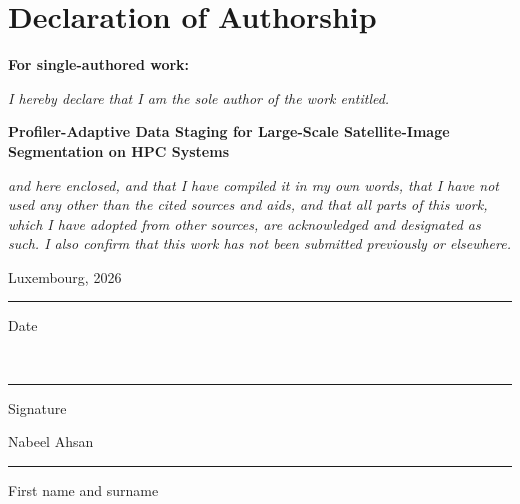 \section*{Declaration of Authorship}

\textbf{For single-authored work:}

\vspace{1em}

\textit{I hereby declare that I am the sole author of the work entitled.}

\vspace{0.5em}

\textbf{Profiler-Adaptive Data Staging for Large-Scale Satellite-Image
Segmentation on HPC Systems}

\vspace{0.5em}

\textit{and here enclosed, and that I have compiled it in my own words, that
I have not used any other than the cited sources and aids, and that all
parts of this work, which I have adopted from other sources, are
acknowledged and designated as such. I also confirm that this work has not
been submitted previously or elsewhere.}

\vspace{3em}

\begin{minipage}[t]{0.45\textwidth}
Luxembourg, 2026\\[2em]
\hrule
Date
\end{minipage}
\hfill
\begin{minipage}[t]{0.45\textwidth}
\phantom{signature}\\[2em]
\hrule
Signature
\end{minipage}

\vspace{2em}

Nabeel Ahsan\\
\hrule
First name and surname
